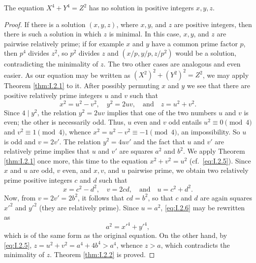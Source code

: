 \begin{theorem}
\label{thm:I.2.2}
The equation $X^{4}+Y^{4}=Z^{2}$ has no solution in positive integers
$x,y,z$.
\end{theorem}

\begin{proof}
If there is a solution $(x,y,z)$, where $x,y$, and $z$ are positive
integers, then there is such a solution in which $z$ is minimal. In this
case, $x,y$, and $z$ are pairwise relatively prime; if for example $x$ and
$y$ have a common prime factor $p$, then $p^{4}$ divides $z^{2}$, so
$p^{2}$ divides $z$ and $(x/p,y/p,z/p^{2})$ would be a solution,
contradicting the minimality of $z$. The two other cases are analogous and
even easier. As our equation may be written as $(X^{2})^{2}+(Y^{2})^{2}=Z^{2}$,
we may apply Theorem \ref{thm:I.2.1} to it. After possibly permuting $x$
and $y$ we see that there are positive relatively prime integers $u$ and $v$
such that
\begin{equation}
x^{2}=u^{2}-v^{2},\quad y^{2}=2uv,\quad\text{and}\quad z=u^{2}+v^{2}.
\label{eq:I.2.5}
\end{equation}
Since $4\mid y^{2}$, the relation $y^{2}=2uv$ implies that one of the two
numbers $u$ and $v$ is even; the other is necessarily odd. Thus, $u$ even
and $v$ odd entails $u^{2}\equiv0\pmod{4}$ and $v^{2}\equiv1\pmod{4}$,
whence $x^{2}=u^{2}-v^{2}\equiv-1\pmod{4}$, an impossibility. So $u$ is odd
and $v=2v'$. The relation $y^{2}=4uv'$ and the fact that $u$ and $v'$ are
relatively prime implies that $u$ and $v'$ are squares $a^{2}$ and $b^{2}$.
We apply Theorem \ref{thm:I.2.1} once more, this time to the equation
$x^{2}+v^{2}=u^{2}$ (cf.\ \eqref{eq:I.2.5}). Since $x$ and $u$ are odd, $v$
even, and $x,v$, and $u$ pairwise prime, we obtain two relatively prime
positive integers $c$ and $d$ such that
\begin{equation}
x=c^{2}-d^{2},\quad v=2cd,\quad\text{and}\quad u=c^{2}+d^{2}.
\label{eq:I.2.6}
\end{equation}
Now, from $v=2v'=2b^{2}$, it follows that $cd=b^{2}$, so that $c$ and $d$
are again squares $x'^{2}$ and $y'^{2}$ (they are relatively prime). Since
$u=a^{2}$, \eqref{eq:I.2.6} may be rewritten as
\begin{equation}
a^{2}=x'^{4}+y'^{4},
\label{eq:I.2.7}
\end{equation}
which is of the same form as the original equation. On the other hand, by
\eqref{eq:I.2.5}, $z=u^{2}+v^{2}=a^{4}+4b^{4}>a^{4}$, whence $z>a$, which
contradicts the minimality of $z$. Theorem \ref{thm:I.2.2} is proved.
\end{proof}

